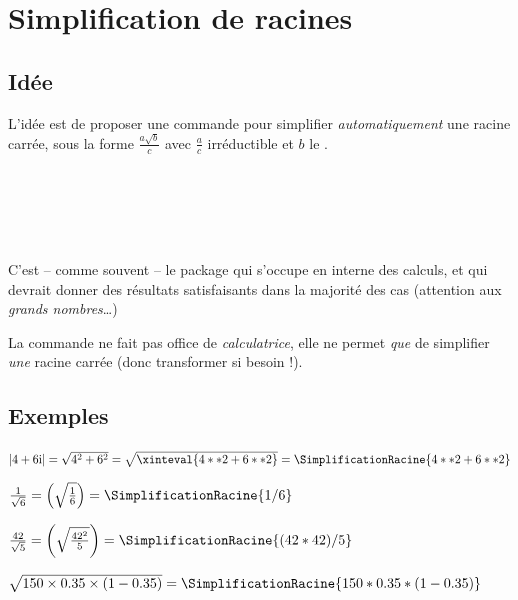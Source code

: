 \documentclass[a4paper,french,11pt]{article}
\newcommand\ctex[1]{\tcbox[vignettelatex]{#1}}
\newcommand\cmaj[1]{%
	{\tcbox[vignetteMaJ]{#1}\xspace}%
}
\begin{document}
\newpage

\section{Simplification de racines}\label{simplracine}

\subsection{Idée}

\begin{codeidee}
\cmaj{2.1.0} L'idée est de proposer une commande pour simplifier \textit{automatiquement} une racine carrée, sous la forme $\frac{a\sqrt{b}}{c}$ avec $\frac{a}{c}$ irréductible et $b$ le .
\end{codeidee}

\begin{codetex}
\end{codetex}

\begin{codetex}[]
 \\ \\
 \\ \\
\end{codetex}

\begin{codeinfo}
C'est -- comme souvent -- le package \ctex{xint} qui s'occupe en interne des calculs, et qui devrait donner des résultats satisfaisants dans la majorité des cas (attention aux \textit{grands nombres}\ldots)

\smallskip

La commande ne fait pas office de \textit{calculatrice}, elle ne permet \textit{que} de simplifier \textit{une} racine carrée (donc transformer si besoin !).
\end{codeinfo}

\subsection{Exemples}

\begin{codetex}[]
$\left| 4+6\text{i}\right| = \sqrt{4^2+6^2} = \sqrt{\xinteval{4**2+6**2}}=\SimplificationRacine{4**2+6**2}$

$\frac{1}{\sqrt{6}}=\left(\sqrt{\frac{1}{6}}\right)=\SimplificationRacine{1/6}$

$\frac{42}{\sqrt{5}}=\left(\sqrt{\frac{42^2}{5}}\right)=\SimplificationRacine{(42*42)/5}$

$\sqrt{\num{150}\times\num{0.35}\times(1-\num{0.35})} = \displaystyle\SimplificationRacine{150*0.35*(1-0.35)}$
\end{codetex}
\end{document}
